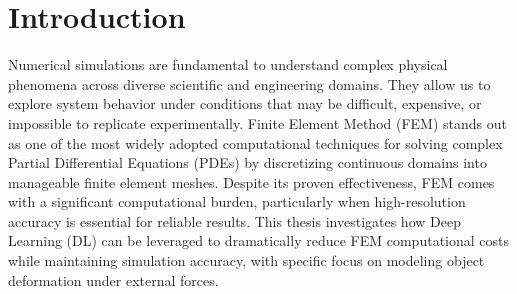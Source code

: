 

\section{Introduction}
Numerical simulations are fundamental to understand complex physical phenomena across diverse scientific and engineering domains. They allow us to explore system behavior under conditions that may be difficult, expensive, or impossible to replicate experimentally. Finite Element Method (FEM) \cite{Quarteroni_2017} stands out as one of the most widely adopted computational techniques for solving complex Partial Differential Equations (PDEs) by discretizing continuous domains into manageable finite element meshes. Despite its proven effectiveness, FEM comes with a significant computational burden, particularly when high-resolution accuracy is essential for reliable results. This thesis investigates how Deep Learning (DL) can be leveraged to dramatically reduce FEM computational costs while maintaining simulation accuracy, with specific focus on modeling object deformation under external forces.


